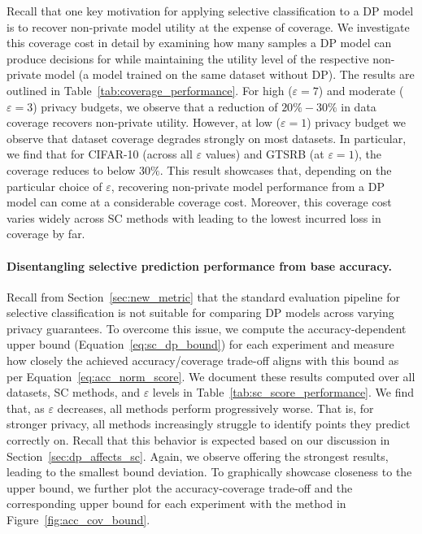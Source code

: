 Recall that one key motivation for applying selective classification to a DP model is to recover non-private model utility at the expense of coverage. We investigate this coverage cost in detail by examining how many samples a DP model can produce decisions for while maintaining the utility level of the respective non-private model (\ie a model trained on the same dataset without DP). The results are outlined in Table~\ref{tab:coverage_performance}. For high (\ie $\varepsilon=7$) and moderate (\ie $\varepsilon=3$) privacy budgets, we observe that a reduction of $20\%-30\%$ in data coverage recovers non-private utility. However, at low (\ie $\varepsilon=1$) privacy budget we observe that dataset coverage degrades strongly on most datasets. In particular, we find that for CIFAR-10 (across all $\varepsilon$ values) and GTSRB (at $\varepsilon=1$), the coverage reduces to below $30\%$. This result showcases that, depending on the particular choice of $\varepsilon$, recovering non-private model performance from a DP model can come at a considerable coverage cost. Moreover, this coverage cost varies widely across SC methods with \sctd leading to the lowest incurred loss in coverage by far.

\paragraph{Disentangling selective prediction performance from base accuracy.}

Recall from Section~\ref{sec:new_metric} that the standard evaluation pipeline for selective classification is not suitable for comparing DP models across varying privacy guarantees. To overcome this issue, we compute the accuracy-dependent upper bound (Equation~\ref{eq:sc_dp_bound}) for each experiment and measure how closely the achieved accuracy/coverage trade-off aligns with this bound as per Equation~\ref{eq:acc_norm_score}. We document these results computed over all datasets, SC methods, and $\varepsilon$ levels in Table~\ref{tab:sc_score_performance}. We find that, as $\varepsilon$ decreases, all methods perform progressively worse. That is, for stronger privacy, all methods increasingly struggle to identify points they predict correctly on. Recall that this behavior is expected based on our discussion in Section~\ref{sec:dp_affects_sc}. Again, we observe \sctd offering the strongest results, leading to the smallest bound deviation. To graphically showcase closeness to the upper bound, we further plot the accuracy-coverage trade-off and the corresponding upper bound for each experiment with the \sctd method in Figure~\ref{fig:acc_cov_bound}. 

